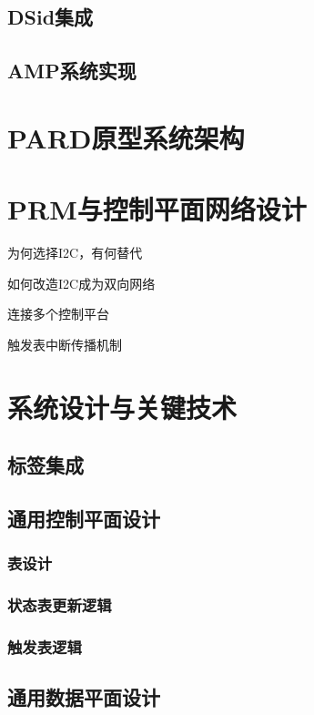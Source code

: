 \subsection{DSid集成}
\subsection{AMP系统实现}



\section{PARD原型系统架构}


\section{PRM与控制平面网络设计}

为何选择I2C，有何替代

如何改造I2C成为双向网络

连接多个控制平台

触发表中断传播机制


\section{系统设计与关键技术}

\subsection{标签集成}

\subsection{通用控制平面设计}

\subsubsection*{表设计}
\subsubsection*{状态表更新逻辑}
\subsubsection*{触发表逻辑}

\subsection{通用数据平面设计}

